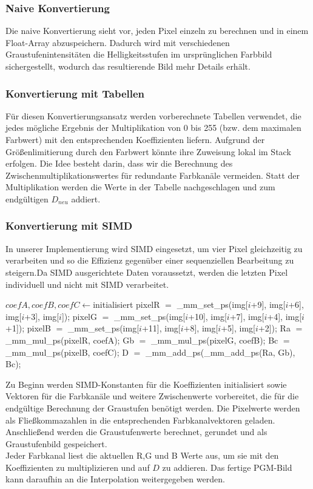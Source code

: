 \documentclass[course=erap]{aspdoc}
\begin{document}
\subsubsection{Naive Konvertierung}
Die naive Konvertierung sieht vor, jeden Pixel einzeln zu berechnen und in einem Float-Array abzuspeichern. Dadurch wird mit verschiedenen Graustufenintensitäten die Helligkeitsstufen im ursprünglichen Farbbild sichergestellt, wodurch das resultierende Bild mehr Details erhält.

\subsubsection{Konvertierung mit Tabellen}
Für diesen Konvertierungsansatz werden vorberechnete Tabellen verwendet, die jedes mögliche Ergebnis der Multiplikation von 0 bis 255 (bzw. dem maximalen Farbwert) mit den entsprechenden Koeffizienten liefern. Aufgrund der Größenlimitierung durch den Farbwert könnte ihre Zuweisung lokal im Stack erfolgen. Die Idee besteht darin, dass wir die Berechnung des Zwischenmultiplikationswertes für redundante Farbkanäle vermeiden. Statt der Multiplikation werden die Werte in der Tabelle nachgeschlagen und zum endgültigen $D_{neu}$ addiert.

\subsubsection{Konvertierung mit SIMD}
In unserer Implementierung wird SIMD  eingesetzt, um vier Pixel gleichzeitig zu verarbeiten und so die Effizienz gegenüber einer sequenziellen Bearbeitung zu steigern.Da SIMD ausgerichtete Daten voraussetzt, werden die letzten Pixel individuell und nicht mit SIMD verarbeitet.\\

\begin{algorithmic}
\State $coefA, coefB, coefC \gets $initialisiert
    \State pixelR $=$ \_mm\_set\_ps(img[$i$+9], img[$i$+6], img[$i$+3], img[$i$]);
    \State pixelG $=$ \_mm\_set\_ps(img[$i$+10], img[$i$+7], img[$i$+4], img[$i$+1]);
    \State pixelB $=$ \_mm\_set\_ps(img[$i$+11], img[$i$+8], img[$i$+5], img[$i$+2]);
    \State
    \State Ra $=$ \_mm\_mul\_ps(pixelR, coefA);
    \State Gb $=$ \_mm\_mul\_ps(pixelG, coefB);
    \State Bc $=$ \_mm\_mul\_ps(pixelB, coefC);
    \State
    \State D $=$ \_mm\_add\_ps(\_mm\_add\_ps(Ra, Gb), Bc);
\EndFor
\end{algorithmic}
Zu Beginn werden SIMD-Konstanten für die Koeffizienten initialisiert sowie Vektoren für die Farbkanäle und weitere Zwischenwerte vorbereitet, die für die endgültige Berechnung der Graustufen benötigt werden. Die Pixelwerte werden als Fließkommazahlen in die entsprechenden Farbkanalvektoren geladen. Anschließend werden die Graustufenwerte berechnet, gerundet und als Graustufenbild gespeichert.\\
Jeder Farbkanal liest die aktuellen R,G und B Werte aus, um sie mit den Koeffizienten zu multiplizieren und auf $D$ zu addieren. Das fertige PGM-Bild kann daraufhin an die Interpolation weitergegeben werden.
\end{document}
